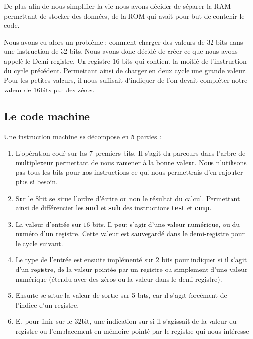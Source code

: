 \documentclass[10pt,a4paper,notitlepage ]{article}
\begin{document}
		De plus afin de nous simplifier la vie nous avons décider de séparer la RAM permettant de stocker des données, de la ROM qui avait pour but de contenir le code.

		Nous avons eu alors un problème : comment charger des valeurs de 32 bits dans une instruction de 32 bits. Nous avons donc décidé de créer ce que nous avons appelé le Demi-registre. Un registre 16 bits qui contient la moitié de l'instruction du cycle précédent. Permettant ainsi de charger en deux cycle une grande valeur. Pour les petites valeurs, il nous suffisait d'indiquer de l'on devait compléter notre valeur de 16bits par des zéros.

		\subsection{Le code machine}

		Une instruction machine se décompose en 5 parties : 
		\begin{enumerate}
			\item L'opération codé sur les 7 premiers bits. Il s'agit du parcours dans l'arbre de multiplexeur permettant de nous ramener à la bonne valeur. Nous n'utilisons pas tous les bits pour nos instructions ce qui nous permettrais d'en rajouter plus si besoin.

			\item Sur le $8$\ieme bit se situe l'ordre d'écrire ou non le résultat du calcul. Permettant ainsi de différencier les \textbf{and} et \textbf{sub} des instructions \textbf{test} et \textbf{cmp}.

			\item La valeur d'entrée sur $16$ bits. Il peut s'agir d'une valeur numérique, ou du numéro d'un registre. Cette valeur est sauvegardé dans le demi-registre pour le cycle suivant.

			\item Le type de l'entrée est ensuite implémenté sur $2$ bits pour indiquer si il s'agit d'un registre, de la valeur pointée par un registre ou simplement d'une valeur numérique (étendu avec des zéros ou la valeur dans le demi-registre).

			\item Ensuite se situe la valeur de sortie sur 5 bits, car il s'agit forcément de l'indice d'un registre.

			\item Et pour finir sur le $32$\ieme bit, une indication sur si il s'agissait de la valeur du registre ou l'emplacement en mémoire pointé par le registre qui nous intéresse
		\end{enumerate}
\end{document}
